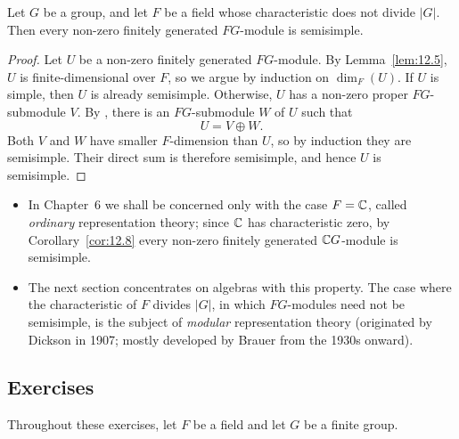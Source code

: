 \documentclass[../Odyssey_Project.tex]{subfiles}
\begin{document}
\begin{corollary}
\label{cor:12.8}
Let $G$ be a group, and let $F$ be a field whose characteristic does not divide $|G|$. Then every non-zero finitely generated $FG$-module is semisimple.
\end{corollary}
\begin{proof}
    Let $U$ be a non-zero finitely generated $FG$-module. By Lemma~\ref{lem:12.5}, $U$ is finite-dimensional over $F$, so we argue by induction on $\dim_F(U)$. If $U$ is simple, then $U$ is already semisimple. Otherwise, $U$ has a non-zero proper $FG$-submodule $V$. By , there is an $FG$-submodule $W$ of $U$ such that
    \[
        U = V \oplus W.
    \]
    Both $V$ and $W$ have smaller $F$-dimension than $U$, so by induction they are semisimple. Their direct sum is therefore semisimple, and hence $U$ is semisimple.
\end{proof}

\begin{itemize}
    \item In Chapter~6 we shall be concerned only with the case $F = \mathbb{C}$, called \emph{ordinary} representation theory; since $\mathbb{C}$ has characteristic zero, by Corollary~\ref{cor:12.8} every non-zero finitely generated $\mathbb{C} G$-module is semisimple.
    \item The next section concentrates on algebras with this property. The case where the characteristic of $F$ divides $|G|$, in which $FG$-modules need not be semisimple, is the subject of \emph{modular} representation theory (originated by Dickson in 1907; mostly developed by Brauer from the 1930s onward).
\end{itemize}

\subsection*{Exercises}

Throughout these exercises, let $F$ be a field and let $G$ be a finite group.
\end{document}
